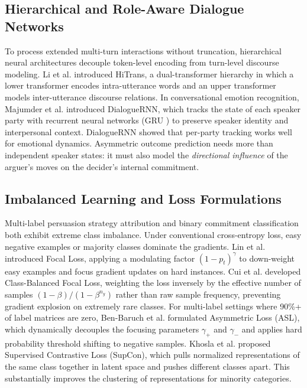 \subsection{Hierarchical and Role-Aware Dialogue Networks}
To process extended multi-turn interactions without truncation, hierarchical neural architectures decouple token-level encoding from turn-level discourse modeling. Li et al. \cite{li2020hitrans} introduced HiTrans, a dual-transformer hierarchy in which a lower transformer encodes intra-utterance words and an upper transformer models inter-utterance discourse relations. In conversational emotion recognition, Majumder et al. \cite{majumder2019dialoguernn} introduced DialogueRNN, which tracks the state of each speaker party with recurrent neural networks (GRU \cite{cho2014learning}) to preserve speaker identity and interpersonal context. DialogueRNN showed that per-party tracking works well for emotional dynamics. Asymmetric outcome prediction needs more than independent speaker states: it must also model the \textit{directional influence} of the arguer's moves on the decider's internal commitment.

\subsection{Imbalanced Learning and Loss Formulations}
Multi-label persuasion strategy attribution and binary commitment classification both exhibit extreme class imbalance. Under conventional cross-entropy loss, easy negative examples or majority classes dominate the gradients. Lin et al. \cite{lin2017focal} introduced Focal Loss, applying a modulating factor $(1 - p_t)^\gamma$ to down-weight easy examples and focus gradient updates on hard instances. Cui et al. \cite{cui2019class} developed Class-Balanced Focal Loss, weighting the loss inversely by the effective number of samples $(1 - \beta) / (1 - \beta^{n_y})$ rather than raw sample frequency, preventing gradient explosion on extremely rare classes. For multi-label settings where 90\%+ of label matrices are zero, Ben-Baruch et al. \cite{benbaruch2021asymmetric} formulated Asymmetric Loss (ASL), which dynamically decouples the focusing parameters $\gamma_+$ and $\gamma_-$ and applies hard probability threshold shifting to negative samples. Khosla et al. \cite{khosla2020supervised} proposed Supervised Contrastive Loss (SupCon), which pulls normalized representations of the same class together in latent space and pushes different classes apart. This substantially improves the clustering of representations for minority categories.

